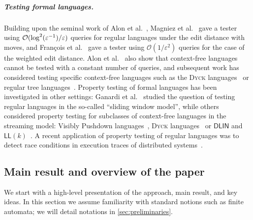 \documentclass[letterpaper, USenglish, cleveref, autoref, thm-restate, numberwithinsect]{lipics-v2021}
\theoremstyle{theorem}
\theoremstyle{definition}
\newcommand{\cO}{\mathcal{O}}
\newcommand{\eps}{\varepsilon}
\newcommand{\epslogeps}[1][]
{\ifthenelse{\equal{#1}{}}{\log(\eps^{-1})/\eps}{\log^{ #1 }(\eps^{-1})/\eps}}
\begin{document}
\subparagraph*{Testing formal languages.} Building upon the seminal work of Alon et al.~\cite{alon2001regular}, Magniez et al.~\cite{magniez2007property} gave a tester using $\cO(\epslogeps[2])$ queries for regular languages under the edit distance with moves, and François et al.~\cite{francois_et_al:LIPIcs:2016:6355} gave a tester using $\cO(1/\eps^2)$ queries for the case of the weighted edit distance.
Alon et al.~\cite{alon2001regular} also show that context-free languages cannot be tested with a constant number of queries, and subsequent work has considered testing specific context-free languages such as the \textsc{Dyck} languages~\cite{parnas2003testing,fischer2018improved} or regular tree languages~\cite{magniez2007property}.
Property testing of formal languages has been investigated in other settings: Ganardi et al.~\cite{ganardi2019sliding} studied the question of testing regular languages in the so-called ``sliding window model'', while others considered property testing for subclasses of context-free languages in the streaming model: Visibly Pushdown languages~\cite{francois_et_al:LIPIcs:2016:6355}, \textsc{Dyck} languages~\cite{JN14,Krebs,MagniezMN14} or $\mathsf{DLIN}$ and $\mathsf{LL}(k)$~\cite{BabuLRV13}.
A recent application of property testing of regular languages was to detect race conditions in execution traces of distributed systems~\cite{ThokairZMV23}.
 
\subsection{Main result and overview of the paper}
We start with a high-level presentation of the approach, main result, and key ideas. In this section we assume familiarity with standard notions such as finite automata; we will detail notations in \cref{sec:preliminaries}.
\end{document}
